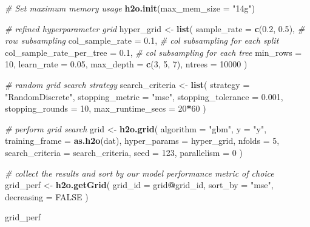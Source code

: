 \documentclass[
]{article}
\newenvironment{Shaded}{\begin{snugshade}}{\end{snugshade}}
\newcommand{\AttributeTok}[1]{\textcolor[rgb]{0.13,0.29,0.53}{#1}}
\newcommand{\CommentTok}[1]{\textcolor[rgb]{0.56,0.35,0.01}{\textit{#1}}}
\newcommand{\ConstantTok}[1]{\textcolor[rgb]{0.56,0.35,0.01}{#1}}
\newcommand{\DecValTok}[1]{\textcolor[rgb]{0.00,0.00,0.81}{#1}}
\newcommand{\FloatTok}[1]{\textcolor[rgb]{0.00,0.00,0.81}{#1}}
\newcommand{\FunctionTok}[1]{\textcolor[rgb]{0.13,0.29,0.53}{\textbf{#1}}}
\newcommand{\NormalTok}[1]{#1}
\newcommand{\OtherTok}[1]{\textcolor[rgb]{0.56,0.35,0.01}{#1}}
\newcommand{\SpecialCharTok}[1]{\textcolor[rgb]{0.81,0.36,0.00}{\textbf{#1}}}
\newcommand{\StringTok}[1]{\textcolor[rgb]{0.31,0.60,0.02}{#1}}
\begin{document}
\begin{Shaded}
\begin{Highlighting}[]
\CommentTok{\# Set maximum memory usage}
\FunctionTok{h2o.init}\NormalTok{(}\AttributeTok{max\_mem\_size =} \StringTok{"14g"}\NormalTok{)}

\CommentTok{\# refined hyperparameter grid}
\NormalTok{hyper\_grid }\OtherTok{\textless{}{-}} \FunctionTok{list}\NormalTok{(}
  \AttributeTok{sample\_rate =} \FunctionTok{c}\NormalTok{(}\FloatTok{0.2}\NormalTok{, }\FloatTok{0.5}\NormalTok{),              }\CommentTok{\# row subsampling}
  \AttributeTok{col\_sample\_rate =} \FloatTok{0.1}\NormalTok{,          }\CommentTok{\# col subsampling for each split}
  \AttributeTok{col\_sample\_rate\_per\_tree =} \FloatTok{0.1}\NormalTok{,  }\CommentTok{\# col subsampling for each tree}
  \AttributeTok{min\_rows =} \DecValTok{10}\NormalTok{,}
  \AttributeTok{learn\_rate =} \FloatTok{0.05}\NormalTok{,}
  \AttributeTok{max\_depth =} \FunctionTok{c}\NormalTok{(}\DecValTok{3}\NormalTok{, }\DecValTok{5}\NormalTok{, }\DecValTok{7}\NormalTok{),}
  \AttributeTok{ntrees =} \DecValTok{10000}
\NormalTok{)}

\CommentTok{\# random grid search strategy}
\NormalTok{search\_criteria }\OtherTok{\textless{}{-}} \FunctionTok{list}\NormalTok{(}
  \AttributeTok{strategy =} \StringTok{"RandomDiscrete"}\NormalTok{,}
  \AttributeTok{stopping\_metric =} \StringTok{"mse"}\NormalTok{,}
  \AttributeTok{stopping\_tolerance =} \FloatTok{0.001}\NormalTok{,}
  \AttributeTok{stopping\_rounds =} \DecValTok{10}\NormalTok{,}
  \AttributeTok{max\_runtime\_secs =} \DecValTok{20}\SpecialCharTok{*}\DecValTok{60}
\NormalTok{)}

\CommentTok{\# perform grid search }
\NormalTok{grid }\OtherTok{\textless{}{-}} \FunctionTok{h2o.grid}\NormalTok{(}
  \AttributeTok{algorithm =} \StringTok{"gbm"}\NormalTok{,}
  \AttributeTok{y =} \StringTok{"y"}\NormalTok{,}
  \AttributeTok{training\_frame =} \FunctionTok{as.h2o}\NormalTok{(dat),}
  \AttributeTok{hyper\_params =}\NormalTok{ hyper\_grid,}
  \AttributeTok{nfolds =} \DecValTok{5}\NormalTok{,}
  \AttributeTok{search\_criteria =}\NormalTok{ search\_criteria,}
  \AttributeTok{seed =} \DecValTok{123}\NormalTok{,}
  \AttributeTok{parallelism =} \DecValTok{0}
\NormalTok{)}

\CommentTok{\# collect the results and sort by our model performance metric of choice}
\NormalTok{grid\_perf }\OtherTok{\textless{}{-}} \FunctionTok{h2o.getGrid}\NormalTok{(}
  \AttributeTok{grid\_id =}\NormalTok{ grid}\SpecialCharTok{@}\NormalTok{grid\_id,}
  \AttributeTok{sort\_by =} \StringTok{"mse"}\NormalTok{,}
  \AttributeTok{decreasing =} \ConstantTok{FALSE}
\NormalTok{)}

\NormalTok{grid\_perf}
\end{Highlighting}
\end{Shaded}
\end{document}
